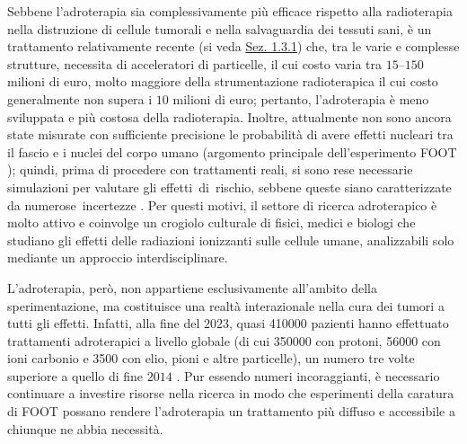 \documentclass[12pt,a4paper,twoside]{report}
\begin{document}
	Sebbene l'adroterapia sia complessivamente più efficace rispetto alla radioterapia nella distruzione di cellule tumorali e nella salvaguardia dei tessuti sani, è un trattamento relativamente recente (si veda \hyperref[sec:storia_adroterapia]{Sez. 1.3.1}) che, tra le varie e complesse strutture, necessita di acceleratori di particelle, il cui costo varia tra $15$--$150$ milioni di euro, molto maggiore della strumentazione radioterapica il cui costo generalmente non supera i $10$ milioni di euro; pertanto, l'adroterapia è meno sviluppata e più costosa della radioterapia. Inoltre, attualmente non sono ancora state misurate con sufficiente precisione le probabilità di avere effetti nucleari tra il fascio e i nuclei del corpo umano (argomento principale dell'esperimento FOOT \cite{foot_site}); quindi, prima di procedere con trattamenti reali, si sono rese necessarie simulazioni per valutare gli effetti di rischio, sebbene queste siano caratterizzate da numerose incertezze \cite{foot_cdr}. Per questi motivi, il settore di ricerca adroterapico è molto attivo e coinvolge un crogiolo culturale di fisici, medici e biologi che studiano gli effetti delle radiazioni ionizzanti sulle cellule umane, analizzabili solo mediante un approccio interdisciplinare.
	
	L'adroterapia, però, non appartiene esclusivamente all'ambito della sperimentazione, ma costituisce una realtà interazionale nella cura dei tumori a tutti gli effetti. Infatti, alla fine del $2023$, quasi \num{410000} pazienti hanno effettuato trattamenti adroterapici a livello globale (di cui \num{350000} con protoni, \num{56000} con ioni carbonio e \num{3500} con elio, pioni e altre particelle), un numero tre volte superiore a quello di fine $2014$ \cite{PTCOG}. Pur essendo numeri incoraggianti, è necessario continuare a investire risorse nella ricerca in modo che esperimenti della caratura di FOOT possano rendere l'adroterapia un trattamento più diffuso e accessibile a chiunque ne abbia necessità.
	
\end{document}
